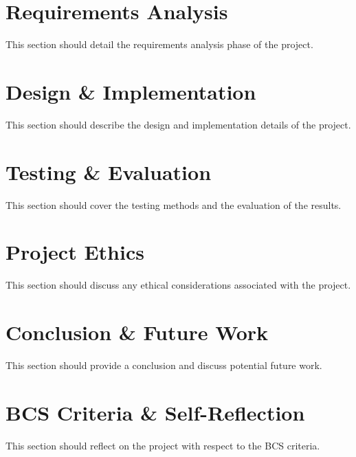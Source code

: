 \documentclass[12pt]{article}
\begin{document}
\section{Requirements Analysis}
This section should detail the requirements analysis phase of the project.

\section{Design \& Implementation}
This section should describe the design and implementation details of the project.

\section{Testing \& Evaluation}
This section should cover the testing methods and the evaluation of the results.

\section{Project Ethics}
This section should discuss any ethical considerations associated with the project.

\section{Conclusion \& Future Work}
This section should provide a conclusion and discuss potential future work.

\section{BCS Criteria \& Self-Reflection}
This section should reflect on the project with respect to the BCS criteria.


\printbibliography
\end{document}
